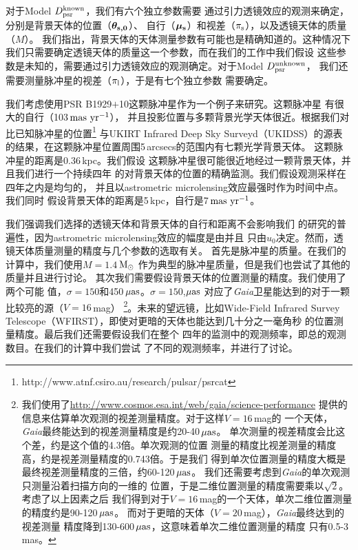 对于Model $D_{\rm{psr}}^{\rm{known}}$，我们有六个独立参数需要
通过引力透镜效应的观测来确定，分别是背景天体的位置（$\bm{\theta_{\rm{s,0}}}$）、
自行（$\bm{\mu_{\rm{s}}}$）和视差（$\pi_{\rm{s}}$），以及透镜天体的质量（$M$）。
我们指出，背景天体的天体测量参数有可能也是精确知道的。这种情况下
我们只需要确定透镜天体的质量这一个参数，而在我们的工作中我们假设
这些参数是未知的，需要通过引力透镜效应的观测确定。对于Model $D_{\rm{psr}}^{\rm{unknown}}$，
我们还需要测量脉冲星的视差（$\pi_{\rm{l}}$），于是有七个独立参数
需要确定。

我们考虑使用PSR B1929$+$10这颗脉冲星作为一个例子来研究。这颗脉冲星
有很大的自行（103\,$\rm{mas\ yr^{-1}}$）\supercite{Chatterjee04}，
并且投影位置与多颗背景光学天体很近。根据我们对比已知脉冲星的位置\supercite{Manchester05}\footnote{http://www.atnf.csiro.au/research/pulsar/psrcat} 
与UKIRT Infrared Deep Sky Surveyd（UKIDSS）的源表\supercite{Lawrence}
的结果，在这颗脉冲星位置周围5\,arcsecs的范围内有七颗光学背景天体。
这颗脉冲星的距离是0.36\,kpc\supercite{Chatterjee04}。我们假设
这颗脉冲星很可能很近地经过一颗背景天体，并且我们进行一个持续四年
的对背景天体的位置的精确监测。我们假设观测采样在四年之内是均匀的，
并且以astrometric microlensing效应最强时作为时间中点。我们同时
假设背景天体的距离是5\,kpc，自行是7\,$\rm{mas\ yr^{-1}}$。

%
我们强调我们选择的透镜天体和背景天体的自行和距离不会影响我们
的研究的普遍性，因为astrometric microlensing效应的幅度是由并且
只由$u_0$决定。然而，透镜天体质量测量的精度与几个参数的选取有关。
首先是脉冲星的质量。在我们的计算中，我们使用$M=1.4$\,$\rm{M_{\odot}}$
作为典型的脉冲星质量，但是我们也尝试了其他的质量并且进行讨论。
其次我们需要假设背景天体的位置测量的精度。我们使用了两个可能
值，$\sigma=150$和450\,$\rm{\mu as}$。$\sigma=150$,$\rm{\mu as}$
对应了\textit{Gaia}卫星能达到的对于一颗比较亮的源（$V=16$\,mag）
\footnote{我们使用了\url{http://www.cosmos.esa.int/web/gaia/science-performance} 
提供的信息来估算单次观测的视差测量精度。对于这样$V=16$\,mag的
一个天体，\textit{Gaia}最终能达到的视差测量精度是约20-40\,$\rm{\mu as}$。
单次测量的视差精度会比这个差，约是这个值的4.3倍。单次观测的位置
测量的精度比视差测量的精度高，约是视差测量精度的0.743倍。于是我们
得到单次位置测量的精度大概是最终视差测量精度的三倍，约60-120\,$\rm{\mu as}$。
我们还需要考虑到\textit{Gaia}的单次观测只测量沿着扫描方向的一维的
位置，于是二维位置测量的精度需要乘以$\sqrt{2}$。考虑了以上因素之后
我们得到对于$V=16$\,mag的一个天体，单次二维位置测量的精度约是90-120\,$\rm{\mu as}$。
而对于更暗的天体（$V=20$\,mag），\textit{Gaia}最终达到的视差测量
精度降到130-600\,$\rm{\mu as}$，这意味着单次二维位置测量的精度
只有0.5-3\,mas。}。未来的望远镜，比如Wide-Field Infrared Survey 
Telescope（WFIRST），即使对更暗的天体也能达到几十分之一毫角秒
的位置测量精度\supercite{Spergel}。最后我们还需要假设我们在整个
四年的监测中的观测频率，即总的观测数目。在我们的计算中我们尝试
了不同的观测频率，并进行了讨论。

